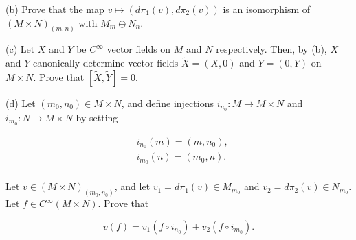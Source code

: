 \begin{problemset}
	(b) Prove that the map $v \mapsto (d\pi_{1}(v), d\pi_{2}(v))$ is an isomorphism of $(M \times N)_{(m,n)}$ with $M_{m} \oplus N_{n}$.

	(c) Let $X$ and $Y$ be $C^{\infty}$ vector fields on $M$ and $N$ respectively. Then, by (b), $X$ and $Y$ canonically determine vector fields $\tilde{X} = (X,0)$ and $\tilde{Y} = (0,Y)$ on $M \times N$. Prove that $[\tilde{X}, \tilde{Y}] = 0$.

	(d) Let  $ (m_{0}, n_{0}) \in M \times N $, and define injections  $ i_{n_{0}}: M \to M \times N $ and  $ i_{m_{0}}: N \to M \times N $ by setting

	\[
		\begin{aligned}{}&{{}i_{n_{0}}(m)=(m,n_{0}),}\\ {}&{{}i_{m_{0}}(n)=(m_{0},n).}\\ \end{aligned}
	\]

	Let  $ v \in (M \times N)_{(m_0, n_0)} $, and let  $ v_1 = d\pi_1(v) \in M_{m_0} $ and  $ v_2 = d\pi_2(v) \in N_{m_0} $. Let  $ f \in C^\infty(M \times N) $. Prove that

	\[
		v(f)=v_{1}(f\circ i_{n_{0}})+v_{2}(f\circ i_{m_{0}}).
	\]

\end{problemset}
